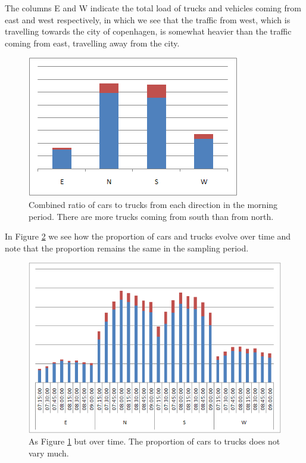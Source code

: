 The columns E and W indicate the total load of trucks and vehicles coming from east and west respectively, in which we see that the traffic from west, which is travelling towards the city of copenhagen, is somewhat heavier than the traffic coming from east, travelling away from the city. 

\begin{figure}[!ht]
\begin{center}
\includegraphics[scale=0.5]{cars_vs_truck_vs_direction.png} 
\end{center}
\caption{Combined ratio of cars to trucks from each direction in the morning period. There are more trucks coming from south than from north.}
\label{fig:cars2trucks}
\end{figure}

In Figure \ref{fig:cars2trucks_time} we see how the proportion of cars and trucks evolve over time and note that the proportion remains the same in the sampling period.

\begin{figure}[!ht]
\begin{center}
\includegraphics[scale=0.5]{cars_vs_trucks_vs_time_morning.png} 
\end{center}
\caption{As Figure \ref{fig:cars2trucks} but over time. The proportion of cars to trucks does not vary much.}
\label{fig:cars2trucks_time}
\end{figure}

